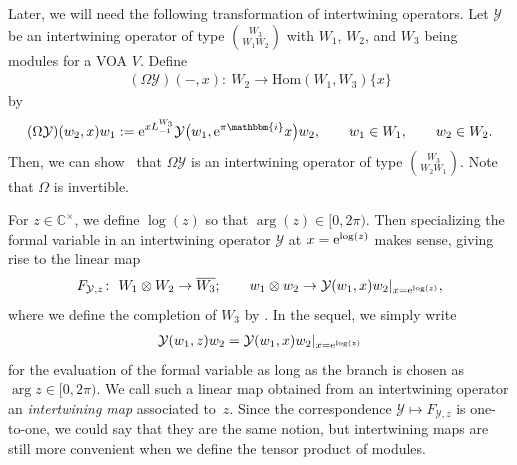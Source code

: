 \documentclass[10pt,a4paper]{amsart}
\numberwithin{equation}{section}
\newcommand{\ol}[1]{\overline{#1}}
\newcommand{\Hom}{\mathrm{Hom}}
\newcommand{\bC}{\mathbb{C}}
\newcommand{\bZ}{\mathbb{Z}}
\newcommand{\bbmi}{\mathbbm{i}}
\newcommand{\voagen}{V}
\newcommand{\voamodgen}{W}
\newcommand{\voaint}{\mathcal{Y}}
\newcommand{\inttyp}[3]{\binom{#3}{#1 #2}}
\newcommand{\intmap}{F}
\newcommand{\vmodvec}{w}
\begin{document}
Later, we will need the following transformation of intertwining operators.
Let $\voaint$ be an intertwining operator of type $\inttyp{\voamodgen_{1}}{\voamodgen_{2}}{\voamodgen_{3}}$ with $\voamodgen_{1}$, $\voamodgen_{2}$, and $\voamodgen_{3}$ being modules for a VOA $\voagen$.
Define
\begin{gather}
 (\Omega\voaint)(-,x)\colon\ \voamodgen_{2}\to\Hom (\voamodgen_{1},\voamodgen_{3})\{x\}\label{eq:int_flip}
\end{gather}
by
\begin{gather*}
 (\Omega\voaint)(\vmodvec_{2},x)\vmodvec_{1}:={\rm e}^{xL^{\voamodgen_{3}}_{-1}}\voaint\big(\vmodvec_{1},{\rm e}^{\pi\bbmi}x\big)\vmodvec_{2},\qquad \vmodvec_{1}\in\voamodgen_{1}, \qquad \vmodvec_{2}\in\voamodgen_{2}.
\end{gather*}
Then, we can show~\cite[Proposition~7.1]{Huang--LepowskyII} that $\Omega\voaint$ is an intertwining operator of type $\inttyp{\voamodgen_{2}}{\voamodgen_{1}}{\voamodgen_{3}}$.
Note that $\Omega$ is invertible.

For $z\in\bC^{\times}$, we define $\log (z)$ so that $\arg (z)\in [0,2\pi)$.
Then specializing the formal variable in an intertwining operator $\voaint$ at $x={\rm e}^{\log (z)}$ makes sense, giving rise to the linear map
\begin{gather*}
 \intmap_{\voaint,z}\colon\ \voamodgen_{1}\otimes\voamodgen_{2}\to\ol{\voamodgen_{3}};\qquad \vmodvec_{1}\otimes\vmodvec_{2}\to \voaint (\vmodvec_{1},x)\vmodvec_{2}|_{x={\rm e}^{\log (z)}},
\end{gather*}
where we define the completion of $\voamodgen_{3}$ by \smash{$\ol{\voamodgen_{3}}=\prod_{n\in\bZ_{\geq 0}}(\voamodgen_{3})_{n}$}.
In the sequel, we simply write
\begin{gather*}
 \voaint (\vmodvec_{1},z)\vmodvec_{2}=\voaint (\vmodvec_{1},x)\vmodvec_{2}|_{x={\rm e}^{\log (z)}}
\end{gather*}
for the evaluation of the formal variable as long as the branch is chosen as $\arg z\in [0,2\pi)$.
We call such a linear map obtained from an intertwining operator an {\it intertwining map} associated to~$z$.
Since the correspondence $\voaint\mapsto \intmap_{\voaint,z}$ is one-to-one, we could say that they are the same notion, but intertwining maps are still more convenient when we define the tensor product of modules.
\end{document}
